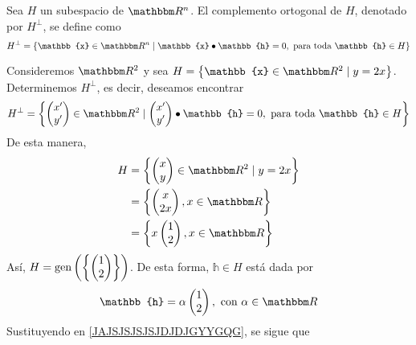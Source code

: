\begin{definition}
    Sea $H$ un subespacio de $\RR[n]$. El complemento ortogonal de $H$, denotado por $H^{\bot}$, se define como
    $$H^{\bot} = \left\{ \mathbb{x} \in \RR[n] \mid \mathbb{x} \bullet \mathbb{h} = 0, \text{ para toda } \mathbb{h} \in H \right\}$$
\end{definition}

\begin{example}
    Consideremos $\RR[2]$ y sea $H = \left\{ \mathbb{x} \in \RR[2] \mid y = 2x \right\}$. Determinemos $H^{\bot}$, es decir, deseamos encontrar
    \begin{equation}
        H^{\bot} = \left\{ \begin{pmatrix} x' \\ y' \end{pmatrix} \in \RR[2] \mid \begin{pmatrix} x' \\ y' \end{pmatrix} \bullet \mathbb{h} = 0, \text{ para toda } \mathbb{h} \in H \right\} \label{JAJSJSJSJSJDJDJGYYGQG}
    \end{equation}\newpage\noindent
    De esta manera,
    \begin{align*}
        H & = \left\{ \begin{pmatrix} x \\ y \end{pmatrix} \in \RR[2] \mid y = 2x \right\} \\
        & = \left\{ \begin{pmatrix} x \\ 2 x \end{pmatrix}, x \in \RR \right\} \\
        & = \left\{ x \begin{pmatrix} 1 \\ 2 \end{pmatrix}, x \in \RR \right\}
    \end{align*}
    Así, $H = \operatorname{gen} \left( \left\{ \begin{pmatrix} 1 \\ 2 \end{pmatrix} \right\} \right)$. De esta forma, $\mathbb{h} \in H$ está dada por
    $$\mathbb{h} = \alpha \begin{pmatrix} 1 \\ 2 \end{pmatrix}, \text{ con } \alpha \in \RR$$
    Sustituyendo en \eqref{JAJSJSJSJSJDJDJGYYGQG}, se sigue que\sideFigure[]{
    \begin{tikzpicture}

\end{tikzpicture}}
\end{example}
